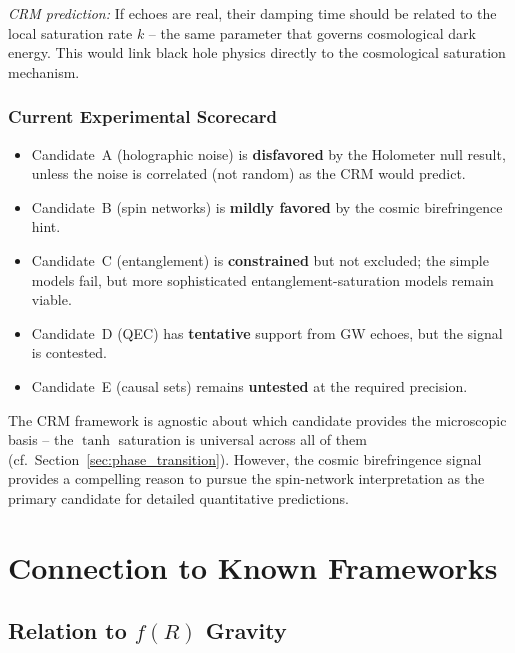 \documentclass[aps,prd,twocolumn,superscriptaddress,nofootinbib]{revtex4-2}
\begin{document}
\textit{CRM prediction:} If echoes are real, their damping time should be related to the local saturation rate $k$ -- the same parameter that governs cosmological dark energy. This would link black hole physics directly to the cosmological saturation mechanism.

\subsubsection{Current Experimental Scorecard}

\begin{itemize}
\item Candidate~A (holographic noise) is \textbf{disfavored} by the Holometer null result, unless the noise is correlated (not random) as the CRM would predict.
\item Candidate~B (spin networks) is \textbf{mildly favored} by the cosmic birefringence hint.
\item Candidate~C (entanglement) is \textbf{constrained} but not excluded; the simple models fail, but more sophisticated entanglement-saturation models remain viable.
\item Candidate~D (QEC) has \textbf{tentative} support from GW echoes, but the signal is contested.
\item Candidate~E (causal sets) remains \textbf{untested} at the required precision.
\end{itemize}

The CRM framework is agnostic about which candidate provides the microscopic basis -- the $\tanh$ saturation is universal across all of them (cf.\ Section~\ref{sec:phase_transition}). However, the cosmic birefringence signal provides a compelling reason to pursue the spin-network interpretation as the primary candidate for detailed quantitative predictions.


\section{Connection to Known Frameworks}
\label{sec:connections}

\subsection{Relation to $f(R)$ Gravity}
\end{document}
